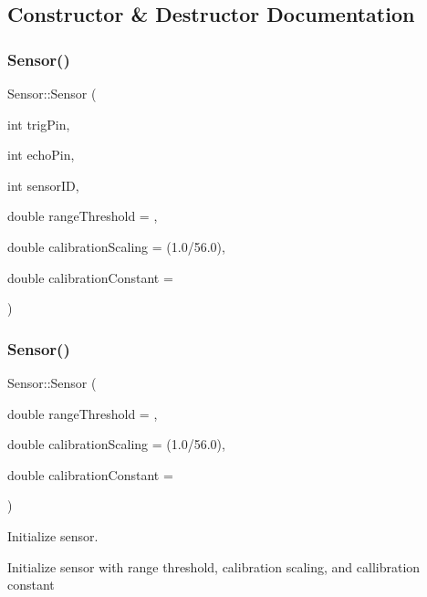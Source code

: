 \subsection{Constructor \& Destructor Documentation}
\mbox{\label{class_sensor_a6d678dbc52786bdd392343e2e24b2658}} 
\subsubsection{\texorpdfstring{Sensor()}{Sensor()}\hspace{0.1cm}{\footnotesize\ttfamily [1/2]}}
{\footnotesize\ttfamily Sensor\+::\+Sensor (\begin{DoxyParamCaption}\item[{int}]{trig\+Pin,  }\item[{int}]{echo\+Pin,  }\item[{int}]{sensor\+ID,  }\item[{double}]{range\+Threshold = {},  }\item[{double}]{calibration\+Scaling = {\ttfamily (1.0/56.0)},  }\item[{double}]{calibration\+Constant = {} }\end{DoxyParamCaption})}

\mbox{\label{class_sensor_afeebb42b714028d41e68f8149c98d19b}} 
\subsubsection{\texorpdfstring{Sensor()}{Sensor()}\hspace{0.1cm}{\footnotesize\ttfamily [2/2]}}
{\footnotesize\ttfamily Sensor\+::\+Sensor (\begin{DoxyParamCaption}\item[{double}]{range\+Threshold = {},  }\item[{double}]{calibration\+Scaling = {\ttfamily (1.0/56.0)},  }\item[{double}]{calibration\+Constant = {} }\end{DoxyParamCaption})}



Initialize sensor. 

Initialize sensor with range threshold, calibration scaling, and callibration constant


